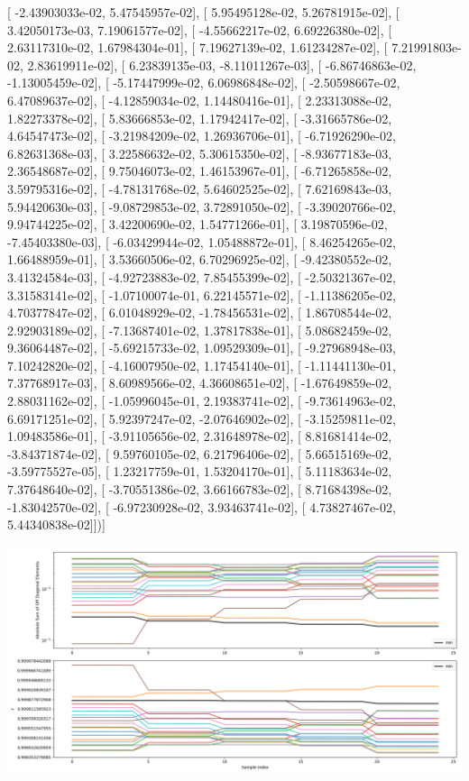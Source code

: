 \documentclass{article}
\begin{document}
       [ -2.43903033e-02,   5.47545957e-02],
       [  5.95495128e-02,   5.26781915e-02],
       [  3.42050173e-03,   7.19061577e-02],
       [ -4.55662217e-02,   6.69226380e-02],
       [  2.63117310e-02,   1.67984304e-01],
       [  7.19627139e-02,   1.61234287e-02],
       [  7.21991803e-02,   2.83619911e-02],
       [  6.23839135e-03,  -8.11011267e-03],
       [ -6.86746863e-02,  -1.13005459e-02],
       [ -5.17447999e-02,   6.06986848e-02],
       [ -2.50598667e-02,   6.47089637e-02],
       [ -4.12859034e-02,   1.14480416e-01],
       [  2.23313088e-02,   1.82273378e-02],
       [  5.83666853e-02,   1.17942417e-02],
       [ -3.31665786e-02,   4.64547473e-02],
       [ -3.21984209e-02,   1.26936706e-01],
       [ -6.71926290e-02,   6.82631368e-03],
       [  3.22586632e-02,   5.30615350e-02],
       [ -8.93677183e-03,   2.36548687e-02],
       [  9.75046073e-02,   1.46153967e-01],
       [ -6.71265858e-02,   3.59795316e-02],
       [ -4.78131768e-02,   5.64602525e-02],
       [  7.62169843e-03,   5.94420630e-03],
       [ -9.08729853e-02,   3.72891050e-02],
       [ -3.39020766e-02,   9.94744225e-02],
       [  3.42200690e-02,   1.54771266e-01],
       [  3.19870596e-02,  -7.45403380e-03],
       [ -6.03429944e-02,   1.05488872e-01],
       [  8.46254265e-02,   1.66488959e-01],
       [  3.53660506e-02,   6.70296925e-02],
       [ -9.42380552e-02,   3.41324584e-03],
       [ -4.92723883e-02,   7.85455399e-02],
       [ -2.50321367e-02,   3.31583141e-02],
       [ -1.07100074e-01,   6.22145571e-02],
       [ -1.11386205e-02,   4.70377847e-02],
       [  6.01048929e-02,  -1.78456531e-02],
       [  1.86708544e-02,   2.92903189e-02],
       [ -7.13687401e-02,   1.37817838e-01],
       [  5.08682459e-02,   9.36064487e-02],
       [ -5.69215733e-02,   1.09529309e-01],
       [ -9.27968948e-03,   7.10242820e-02],
       [ -4.16007950e-02,   1.17454140e-01],
       [ -1.11441130e-01,   7.37768917e-03],
       [  8.60989566e-02,   4.36608651e-02],
       [ -1.67649859e-02,   2.88031162e-02],
       [ -1.05996045e-01,   2.19383741e-02],
       [ -9.73614963e-02,   6.69171251e-02],
       [  5.92397247e-02,  -2.07646902e-02],
       [ -3.15259811e-02,   1.09483586e-01],
       [ -3.91105656e-02,   2.31648978e-02],
       [  8.81681414e-02,  -3.84371874e-02],
       [  9.59760105e-02,   6.21796406e-02],
       [  5.66515169e-02,  -3.59775527e-05],
       [  1.23217759e-01,   1.53204170e-01],
       [  5.11183634e-02,   7.37648640e-02],
       [ -3.70551386e-02,   3.66166783e-02],
       [  8.71684398e-02,  -1.83042570e-02],
       [ -6.97230928e-02,   3.93463741e-02],
       [  4.73827467e-02,   5.44340838e-02]])]
\begin{center}
\includegraphics[scale=.9]{report_pickled_controls215/control_dpn_all.png}

\end{center}
\end{document}
